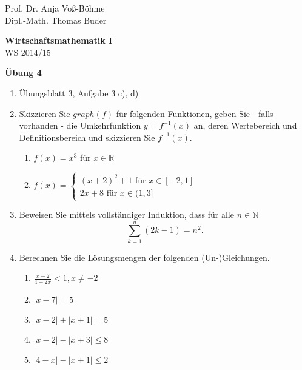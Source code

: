 \documentclass[12pt,a4paper]{scrreprt}
\newcommand{\N}{\mathds{N}}
\newcommand{\R}{\mathds{R}}
\begin{document}
 
\begin{flushleft}
Prof. Dr. Anja Voß-Böhme \\
Dipl.-Math. Thomas Buder
\end{flushleft}

\begin{center}
\large{\textbf{ Wirtschaftsmathematik I}} \\
WS 2014/15 \end{center}

\begin{center}\large{\textbf{ Übung 4 }} \end{center}

\bigskip
\begin{enumerate}
\item Übungsblatt 3, Aufgabe 3 c), d)
\item Skizzieren Sie $graph(f)$ für folgenden Funktionen, geben Sie  - falls vorhanden - die Umkehrfunktion $y=f^{-1}(x)$ an,  deren Wertebereich und Definitionsbereich und skizzieren Sie $f^{-1}(x)$.
		\begin{enumerate}
			\item $f(x)=x^3$ für $x \in \R$
			\item $f(x)= \begin{cases}
													(x+2)^2+1 \text{ für  } x \in [-2,1] \\
													2x+8 \text{ für  } x \in (1,3]
										\end{cases}$
			\end{enumerate}
\item Beweisen Sie mittels vollständiger Induktion, dass für alle $n \in \N$ \[ \sum\limits_{k=1}^n (2k-1) = n^2.\]
\item Berechnen Sie die Lösungsmengen der folgenden (Un-)Gleichungen.
			\begin{enumerate}
			  \item $\frac{x-2}{4+2x} < 1,  x \neq -2$
				\item $|x-7| = 5$
				\item $|x-2| + |x+1| = 5$
				\item $|x - 2| - |x + 3| \leq 8$
				\item $|4 - x| - |x + 1| \leq 2$



\end{enumerate}
\end{enumerate}
\end{document}

